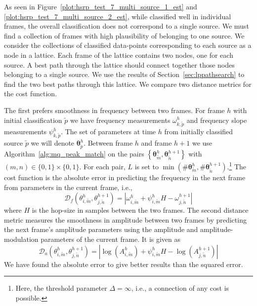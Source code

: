 As seen in Figure~\ref{plot:hsrp_test_7_multi_source_1_est} and
\ref{plot:hsrp_test_7_multi_source_2_est}, while
classified well in individual frames, the overall classification does not
correspond to a single source. We must find a collection of frames with high
plausibility of belonging to one source. We consider the collections of
classified data-points corresponding to each source as a node in a lattice. Each
frame of the lattice contains two nodes, one for each source. A best path
through the lattice should connect together those nodes belonging to a single
source. We use the results of
Section~\ref{sec:lppathsearch} to find the two best paths through this lattice.
We compare two distance metrics for the cost function.

The first prefers
smoothness in frequency between two frames. For frame $h$ with initial
classification $\tilde{p}$ we have frequency measurements
$\omega_{k,\tilde{p}}^{h}$
and frequency slope measurements $\psi_{k,\tilde{p}}^{h}$. The set of parameters
at time $h$ from initially classified source $\tilde{p}$ we will denote
$\boldsymbol{\theta}_{\tilde{p}}^{h}$. Between frame $h$ and frame $h+1$ we use
Algorithm~\ref{alg:mq_peak_match} on the pairs $\left\{ \boldsymbol{\theta}_{\tilde{m}}^{h},
\boldsymbol{\theta}_{\tilde{n}}^{h+1} \right\}$ with $(m,n) \in \{0,1\} \times
\{0,1\}$. For
each pair, $L$ is set to $\min(\# \boldsymbol{\theta}_{\tilde{m}}^{h} ,
\# \boldsymbol{\theta}_{\tilde{n}}^{h+1}).$\footnote{Here, the threshold parameter $\Delta
= \infty$, i.e., a connection of any cost is possible.} The cost function is the absolute error
in predicting the frequency in the next frame from parameters in the current
frame, i.e.,
\[
    \mathcal{D}_{f} \left( \theta_{i,\tilde{m}}^{h},
    \theta_{j,\tilde{n}}^{h+1} \right) = | \omega_{i,\tilde{m}}^{h} +
    \psi_{i,\tilde{m}}^{h} H - \omega_{j,\tilde{n}}^{h+1} |
\]
where $H$ is the hop-size in samples between the two frames.  The second
distance metric measures the smoothness in amplitude between two frames by
predicting the next frame's amplitude parameters using the amplitude and
amplitude-modulation parameters of the current frame.  It is given as
\[
    \mathcal{D}_{a} \left( \theta_{i,\tilde{m}}^{h},
    \theta_{j,\tilde{n}}^{h+1} \right) = | \log(A_{i,\tilde{m}}^{h}) +
    \psi_{i,\tilde{m}}^{h} H - \log(A_{j,\tilde{n}}^{h+1}) |
\]
We have found the absolute error to
give better results than the squared error.


